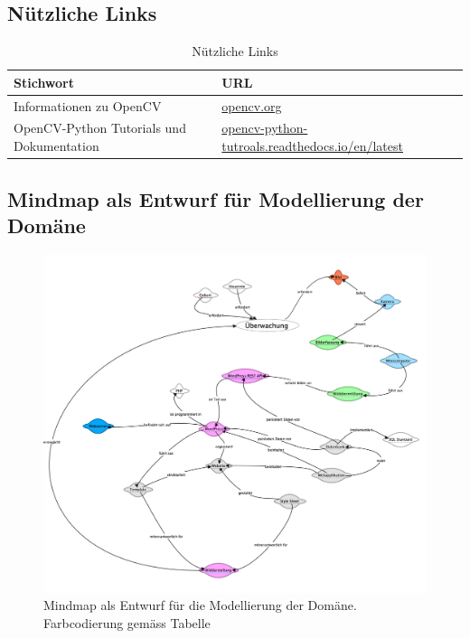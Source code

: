 \subsection{Nützliche Links}

\begin{table}[H]
	
	\begin{tabular}{p{6cm} p{9cm}|}
		
		\toprule[1pt]
		\rowcolor{maroon!30}
		
		Stichwort & URL \\
		
		\midrule 	
		Informationen zu OpenCV & \url{opencv.org}\\
		OpenCV-Python Tutorials und Dokumentation & \url{opencv-python-tutroals.readthedocs.io/en/latest}\\

		
		\bottomrule
	\end{tabular}
	\caption{Nützliche Links}
	\label{fig: Nützliche Links}
\end{table}

\begin{landscape}
\section{Mindmap als Entwurf für Modellierung der Domäne}
\begin{figure}[H]
	\center
	\includegraphics[scale=.09]{Grafiken/mmDomain.jpg}
	\caption{Mindmap als Entwurf für die Modellierung der Domäne. Farbcodierung gemäss Tabelle }
	\label{fig: Mindmap als Entwurf die für Modellierung der Domäne. Farbcodierung gemäss Tabelle}
\end{figure}
	
\end{landscape}